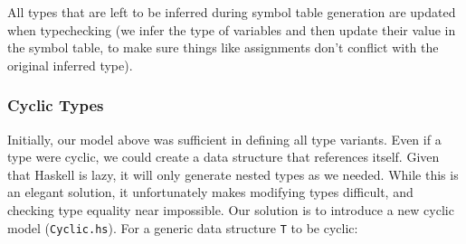 \documentclass[11pt]{article}
\begin{document}
All types that are left to be inferred during symbol table generation
are updated when typechecking (we infer the type of variables and then
update their value in the symbol table, to make sure things like
assignments don't conflict with the original inferred type).

\subsubsection{Cyclic Types}

Initially, our model above was sufficient in defining all type variants.
Even if a type were cyclic, we could create a data structure that references itself.
Given that Haskell is lazy, it will only generate nested types as we needed.
While this is an elegant solution, it unfortunately makes modifying types difficult, and checking type equality near impossible.
Our solution is to introduce a new cyclic model (\texttt{Cyclic.hs}).
For a generic data structure \texttt{T} to be cyclic:
\end{document}
